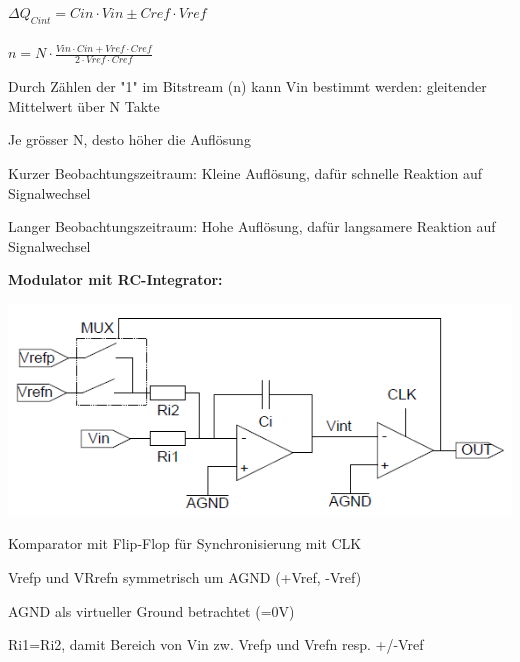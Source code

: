\begin{minipage}{0.40\textwidth}
     $\Delta Q_{Cint} = Cin \cdot Vin \pm Cref \cdot Vref$
    \\\\  $n = N \cdot \frac{Vin \cdot Cin + Vref \cdot Cref}{2 \cdot Vref \cdot Cref}$\\
    \begin{compactitem}
        \item Durch Zählen der "1" im Bitstream (n) kann Vin bestimmt werden: gleitender Mittelwert über N Takte
        \item Je grösser N, desto höher die Auflösung
        \item Kurzer Beobachtungszeitraum: Kleine Auflösung, dafür schnelle Reaktion auf Signalwechsel
        \item Langer Beobachtungszeitraum: Hohe Auflösung, dafür langsamere Reaktion auf Signalwechsel
    \end{compactitem}

\end{minipage}
\textbf{Modulator mit RC-Integrator:}\\
\begin{minipage}{0.55\textwidth}
    \includegraphics[width=1.0\textwidth]{images/SigmaDeltaDualSlope}
\end{minipage}
\hfill
\begin{minipage}{0.40\textwidth}
    \begin{compactitem}
        \item Komparator mit Flip-Flop für Synchronisierung mit CLK 
        \item Vrefp und VRrefn symmetrisch um AGND (+Vref, -Vref)
        \item AGND als virtueller Ground betrachtet (=0V)
        \item Ri1=Ri2, damit Bereich von Vin zw. Vrefp und Vrefn resp. +/-Vref
    \end{compactitem}
\end{minipage}
